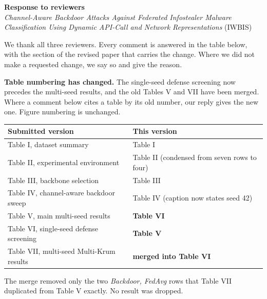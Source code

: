 \documentclass[11pt,a4paper]{article}
\begin{document}
\begin{center}
{\large\bfseries Response to reviewers}\\[0.4em]
\textit{Channel-Aware Backdoor Attacks Against Federated Infostealer Malware Classification
Using Dynamic API-Call and Network Representations} \quad (IWBIS)
\end{center}

We thank all three reviewers. Every comment is answered in the table below, with the section of the
revised paper that carries the change. Where we did not make a requested change, we say so and give
the reason.

\textbf{Table numbering has changed.} The single-seed defense screening now precedes the multi-seed
results, and the old Tables V and VII have been merged. Where a comment below cites a table by its
old number, our reply gives the new one. Figure numbering is unchanged.

\begin{center}
\begin{tabular}{@{}ll@{}}
\toprule
\textbf{Submitted version} & \textbf{This version} \\
\midrule
Table I, dataset summary & Table I \\
Table II, experimental environment & Table II (condensed from seven rows to four) \\
Table III, backbone selection & Table III \\
Table IV, channel-aware backdoor sweep & Table IV (caption now states seed 42) \\
Table V, main multi-seed results & \textbf{Table VI} \\
Table VI, single-seed defense screening & \textbf{Table V} \\
Table VII, multi-seed Multi-Krum results & \textbf{merged into Table VI} \\
\bottomrule
\end{tabular}
\end{center}

The merge removed only the two \emph{Backdoor, FedAvg} rows that Table VII duplicated from Table V
exactly. No result was dropped.
\end{document}
